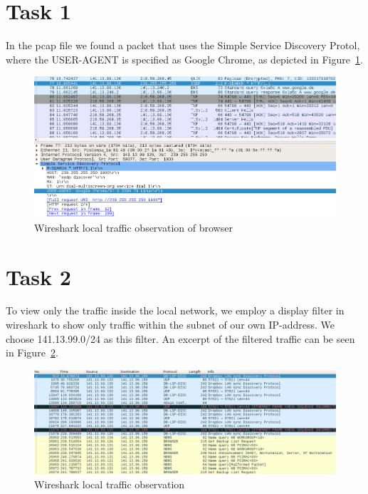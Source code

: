 \documentclass[12pt]{article}
\begin{document}
\maketitle


\section{Task 1}\label{task1}
In the pcap file we found a packet that uses the Simple Service Discovery Protol, where the USER-AGENT is specified as Google Chrome, as depicted in Figure~\ref{wireshark_evidence}.
\begin{figure}[h]%
\centering%
\includegraphics[width=\textwidth]{images/task_1_evidence_browser.png}%
\caption{Wireshark local traffic observation of browser}%
\label{wireshark_evidence}%
\end{figure}%



\section{Task 2}\label{task2}
To view only the traffic inside the local network, we employ a display filter in wireshark to show only traffic within the subnet of our own IP-address. We choose 141.13.99.0/24 as this filter. An excerpt of the filtered traffic can be seen in Figure~\ref{img_wireshark_overview}.

\begin{figure}[h]%
\centering%
\includegraphics[width=\textwidth]{images/wireshark_overview.png}%
\caption{Wireshark local traffic observation}%
\label{img_wireshark_overview}%
\end{figure}%
\end{document}
